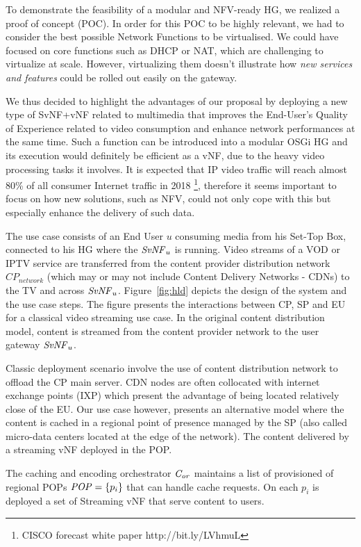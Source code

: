 To demonstrate the feasibility of a modular and NFV-ready HG, we realized a proof of concept (POC).
In order for this POC to be highly relevant, we had to consider the best possible Network Functions to be virtualised.
We could have focused on core functions such as DHCP or NAT, which are challenging to virtualize at scale. However, virtualizing them doesn't illustrate how \textit{new services and features} could be rolled out easily on the gateway.

We thus decided to highlight the advantages of our proposal by deploying a new type of SvNF+vNF related to multimedia that improves the End-User's Quality of Experience related to video consumption and enhance network performances at the same time.
Such a function can be introduced into a modular OSGi HG and its execution would definitely be efficient as a vNF, due to the heavy video processing tasks it involves.
It is expected that IP video traffic will reach almost 80\% of all consumer Internet traffic in 2018 \footnote{CISCO forecast white paper http://bit.ly/LVhmuL }, therefore it seems important to focus on how new solutions, such as NFV, could not only cope with this but especially enhance the delivery of such data.

The use case consists of an End User $u$ consuming media from his Set-Top Box, connected to his HG where the $\mathit{SvNF}_{u}$ is running.
Video streams of a VOD or IPTV service are transferred from the content provider distribution network \(\mathit{CP}_{\mathit{network}}\) (which may or may not include Content Delivery Networks - CDNs) to the TV and across $\mathit{SvNF}_{u}$.
Figure~\ref{fig:hld} depicts the design of the system and the use case steps. The figure presents the interactions between CP, SP and EU for a classical video streaming use case.
In the original content distribution model, content is streamed from the content provider network  to the user gateway \(\mathit{SvNF}_{u}\).

Classic deployment scenario involve the use of content distribution network to offload the CP main server.
CDN nodes are often collocated with internet exchange points (IXP) which present the advantage of being located relatively close of the EU. Our use case however, presents an alternative model where the content is cached in a regional point of presence managed by the SP (also called micro-data centers located at the edge of the network). The content delivered by a streaming vNF deployed in the POP.

The caching and encoding orchestrator  $\mathit{C_{or}}$ maintains a list of provisioned of regional POPs \(\mathit{POP}=\{p_{i}\}\) that can handle cache requests. On each $p_{i}$ is deployed a set of Streaming vNF that serve content to users.

